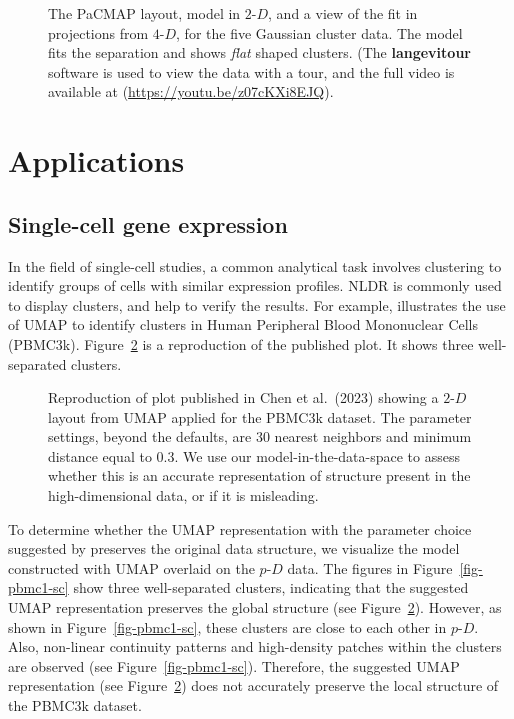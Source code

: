\documentclass[
  12pt]{article}
\newcommand\pD{$p\text{-}D$}
\newcommand\gD{$2\text{-}D$}
\begin{document}
\begin{figure}[H]
\caption{\label{fig-gau-pacmap-sc}The PaCMAP layout, model in \gD{}, and
a view of the fit in projections from \(4\text{-}D\), for the five
Gaussian cluster data. The model fits the separation and shows
\emph{flat} shaped clusters. (The \textbf{langevitour} software is used
to view the data with a tour, and the full video is available at
(\url{https://youtu.be/z07cKXi8EJQ}).}

\end{figure}%

\section{Applications}\label{sec-applications}

\subsection{Single-cell gene
expression}\label{single-cell-gene-expression}

In the field of single-cell studies, a common analytical task involves
clustering to identify groups of cells with similar expression profiles.
NLDR is commonly used to display clusters, and help to verify the
results. For example, \citet{chen2023} illustrates the use of UMAP to
identify clusters in Human Peripheral Blood Mononuclear Cells (PBMC3k).
Figure~\ref{fig-umap-author} is a reproduction of the published plot. It
shows three well-separated clusters.

\begin{figure}[H]


\caption{\label{fig-umap-author}Reproduction of plot published in Chen
et al.~(2023) showing a \(2\text{-}D\) layout from UMAP applied for the
PBMC3k dataset. The parameter settings, beyond the defaults, are 30
nearest neighbors and minimum distance equal to 0.3. We use our
model-in-the-data-space to assess whether this is an accurate
representation of structure present in the high-dimensional data, or if
it is misleading.}

\end{figure}%

To determine whether the UMAP representation with the parameter choice
suggested by \citet{chen2023} preserves the original data structure, we
visualize the model constructed with UMAP overlaid on the \pD{} data.
The figures in Figure~\ref{fig-pbmc1-sc} show three well-separated
clusters, indicating that the suggested UMAP representation preserves
the global structure (see Figure~\ref{fig-umap-author}). However, as
shown in Figure~\ref{fig-pbmc1-sc}, these clusters are close to each
other in \pD{}. Also, non-linear continuity patterns and high-density
patches within the clusters are observed (see
Figure~\ref{fig-pbmc1-sc}). Therefore, the suggested UMAP representation
(see Figure~\ref{fig-umap-author}) does not accurately preserve the
local structure of the PBMC3k dataset.
\end{document}
